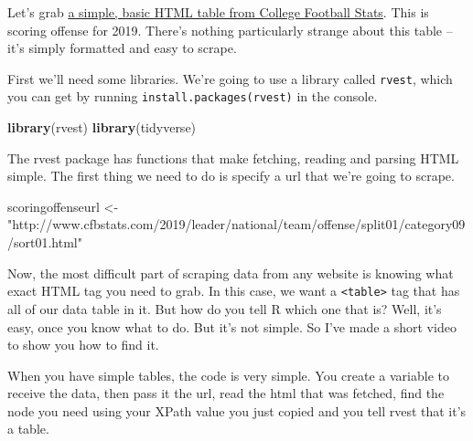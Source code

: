 \documentclass[
]{book}
\newenvironment{Shaded}{\begin{snugshade}}{\end{snugshade}}
\newcommand{\DataTypeTok}[1]{\textcolor[rgb]{0.13,0.29,0.53}{#1}}
\newcommand{\KeywordTok}[1]{\textcolor[rgb]{0.13,0.29,0.53}{\textbf{#1}}}
\newcommand{\NormalTok}[1]{#1}
\newcommand{\OperatorTok}[1]{\textcolor[rgb]{0.81,0.36,0.00}{\textbf{#1}}}
\newcommand{\StringTok}[1]{\textcolor[rgb]{0.31,0.60,0.02}{#1}}
\begin{document}
Let's grab \href{http://www.cfbstats.com/2019/leader/national/team/offense/split01/category09/sort01.html}{a simple, basic HTML table from College Football Stats}. This is scoring offense for 2019. There's nothing particularly strange about this table -- it's simply formatted and easy to scrape.

First we'll need some libraries. We're going to use a library called \texttt{rvest}, which you can get by running \texttt{install.packages(\textquotesingle{}rvest\textquotesingle{})} in the console.

\begin{Shaded}
\begin{Highlighting}[]
\KeywordTok{library}\NormalTok{(rvest)}
\KeywordTok{library}\NormalTok{(tidyverse)}
\end{Highlighting}
\end{Shaded}

The rvest package has functions that make fetching, reading and parsing HTML simple. The first thing we need to do is specify a url that we're going to scrape.

\begin{Shaded}
\begin{Highlighting}[]
\NormalTok{scoringoffenseurl <-}\StringTok{ "http://www.cfbstats.com/2019/leader/national/team/offense/split01/category09/sort01.html"}
\end{Highlighting}
\end{Shaded}

Now, the most difficult part of scraping data from any website is knowing what exact HTML tag you need to grab. In this case, we want a \texttt{\textless{}table\textgreater{}} tag that has all of our data table in it. But how do you tell R which one that is? Well, it's easy, once you know what to do. But it's not simple. So I've made a short video to show you how to find it.

When you have simple tables, the code is very simple. You create a variable to receive the data, then pass it the url, read the html that was fetched, find the node you need using your XPath value you just copied and you tell rvest that it's a table.

\begin{Shaded}
\end{Shaded}
\end{document}

